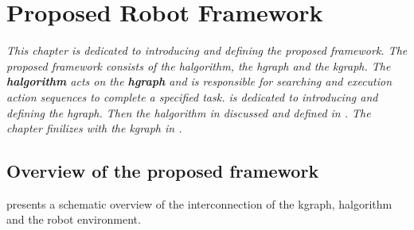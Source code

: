 

\chapter{Proposed Robot Framework}%
\label{chap:hgraph_and_kgraph}
\textit{This chapter is dedicated to introducing and defining the proposed framework. The proposed framework consists of the \acl{halgorithm}, the \acl{hgraph} and the \acl{kgraph}. The \textbf{\acf{halgorithm}} acts on the \textbf{\acf{hgraph}} and is responsible for searching and execution action sequences to complete a specified task.  is dedicated to introducing and defining the \ac{hgraph}. Then the \ac{halgorithm} in discussed and defined in . The chapter finilizes with the \ac{kgraph} in .\bs}

\section{Overview of the proposed framework}
 presents a schematic overview of the interconnection of the \ac{kgraph}, \ac{halgorithm} and the robot environment.\bs

